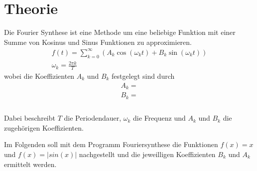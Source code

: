 \section{Theorie}
\label{sec:Theorie}
Die Fourier Synthese ist eine Methode um eine beliebige Funktion mit einer Summe von Kosinus und Sinus Funktionen zu approximieren.
\begin{gather}
    f(t) = \sum_{k=0}^{\infty} (A_k\cos(\omega_k t)+B_k\sin(\omega_k t))\\
    \omega_k = \frac{2\pi k}{T}
\end{gather}
wobei die Koeffizienten $A_k$ und $B_k$ festgelegt sind durch
\begin{gather}
    A_k=\\
    B_k=\\
\end{gather}
\\
Dabei beschreibt $T$ die Periodendauer, $\omega_k$ die Frequenz und $A_k$ und $B_k$ die zugehörigen Koeffizienten. 

Im Folgenden soll mit dem Programm Fouriersynthese %
die Funktionen $f(x)=x$ und $f(x)=|sin(x)|$ nachgestellt und die jeweilligen Koeffizienten $B_k$ und $A_k$ ermittelt werden.
\cite{sample}
